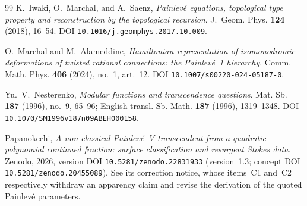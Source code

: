 \documentclass[11pt,reqno]{amsart}
\renewcommand{\_}{\vquadorigunderscore\allowbreak}
\theoremstyle{plain}
\theoremstyle{definition}
\begin{document}
\begin{thebibliography}{99}
K.~Iwaki, O.~Marchal, and A.~Saenz,
\emph{Painlev\'e equations, topological type property and reconstruction by the topological
recursion}.
J.~Geom. Phys. \textbf{124} (2018), 16--54.
DOI \texttt{10.1016/j.geomphys.2017.10.009}.

O.~Marchal and M.~Alameddine,
\emph{Hamiltonian representation of isomonodromic deformations of twisted rational connections: the
Painlev\'e~1 hierarchy}.
Comm. Math. Phys. \textbf{406} (2024), no.~1, art.~12.
DOI \texttt{10.1007/s00220-024-05187-0}.

Yu.~V.~Nesterenko,
\emph{Modular functions and transcendence questions}.
Mat. Sb. \textbf{187} (1996), no.~9, 65--96; English transl. Sb. Math. \textbf{187} (1996),
1319--1348.
DOI \texttt{10.1070/SM1996v187n09ABEH000158}.

Papanokechi,
\emph{A non-classical Painlev\'e~V transcendent from a quadratic polynomial continued fraction:
surface classification and resurgent Stokes data}.
Zenodo, 2026, version DOI \texttt{10.5281/zenodo.22831933} (version~1.3; concept DOI
\texttt{10.5281/zenodo.20455089}). See its correction notice, whose items~C1 and~C2 respectively
withdraw an apparency claim and revise the derivation of the quoted Painlev\'e parameters.

\end{thebibliography}
\end{document}
